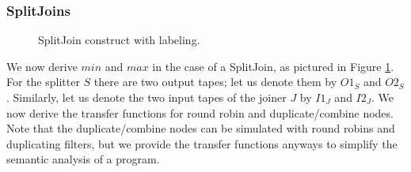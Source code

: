\subsubsection{SplitJoins}

\begin{figure}
\centering
{}
\caption{\protect\small SplitJoin construct with labeling.
\protect\label{splitjoin}}
\end{figure}

We now derive $min$ and $max$ in the case of a SplitJoin, as pictured
in Figure \ref{splitjoin}.  For the splitter $S$ there are two output
tapes; let us denote them by $O1_S$ and $O2_S$.  Similarly, let us
denote the two input tapes of the joiner $J$ by $I1_J$ and $I2_J$.  We
now derive the transfer functions for round robin and
duplicate/combine nodes.  Note that the duplicate/combine nodes can be
simulated with round robins and duplicating filters, but we provide
the transfer functions anyways to simplify the semantic analysis of a
program.

